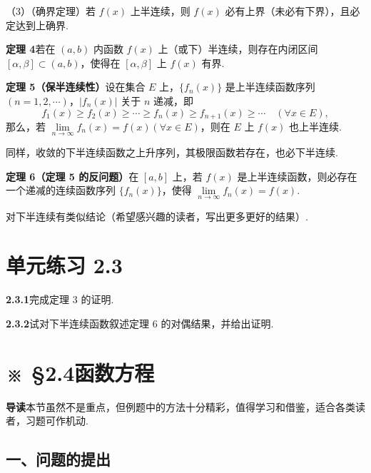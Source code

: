 \documentclass[UTF8,12pt,a4paper,fontset=fandol]{ctexart}
\begin{document}
（3）（确界定理）若 $f(x)$ 上半连续，则 $f(x)$ 必有上界（未必有下界），且必定达到上确界.

\noindent\textbf{定理 4}\quad 若在 $(a,b)$ 内函数 $f(x)$ 上（或下）半连续，则存在内闭区间 $[\alpha,\beta]\subset(a,b)$，使得在 $[\alpha,\beta]$ 上 $f(x)$ 有界.

\noindent\textbf{定理 5（保半连续性）}\quad 设在集合 $E$ 上，$\{f_n(x)\}$ 是上半连续函数序列 $(n=1,2,\cdots)$，$|f_n(x)|$ 关于 $n$ 递减，即
\[
  f_1(x)\ge f_2(x)\ge\cdots\ge f_n(x)\ge f_{n+1}(x)\ge\cdots\quad(\forall x\in E),
\]
那么，若 $\lim\limits_{n\to\infty}f_n(x)=f(x)(\forall x\in E)$，则在 $E$ 上 $f(x)$ 也上半连续.

同样，收敛的下半连续函数之上升序列，其极限函数若存在，也必下半连续.

\noindent\textbf{定理 6（定理 5 的反问题）}\quad 在 $[a,b]$ 上，若 $f(x)$ 是上半连续函数，则必存在一个递减的连续函数序列 $\{f_n(x)\}$，使得 $\lim\limits_{n\to\infty}f_n(x)=f(x)$.

对下半连续有类似结论（希望感兴趣的读者，写出更多更好的结果）.

\section*{单元练习 2.3}

\noindent\textbf{2.3.1}\quad 完成定理 3 的证明.

\noindent\textbf{2.3.2}\quad 试对下半连续函数叙述定理 6 的对偶结果，并给出证明.

\section*{※ §2.4\quad 函数方程}

\noindent\textbf{导读}\quad 本节虽然不是重点，但例题中的方法十分精彩，值得学习和借鉴，适合各类读者，习题可作机动.

\subsection*{一、问题的提出}
\end{document}
